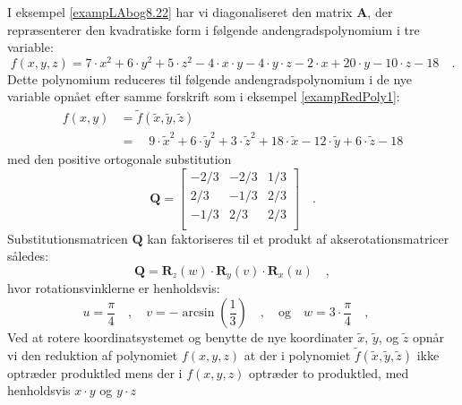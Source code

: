 \begin{example} \label{exampRedPoly3}
I eksempel \ref{exampLAbog8.22} har vi diagonaliseret den matrix $\mathbf{A}$, der repræsenterer den kvadratiske form i
følgende andengradspolynomium i tre variable:
\begin{equation}
f(x,y, z) = 7\cdot x^{2} + 6\cdot y^{2} + 5\cdot z^{2} - 4\cdot x\cdot y - 4\cdot y\cdot z - 2\cdot x + 20\cdot y -10\cdot z -18 \quad .
\end{equation}
Dette polynomium reduceres til følgende andengradspolynomium  i de nye variable opnået efter samme forskrift som i eksempel \ref{exampRedPoly1}:
\begin{equation}
\begin{aligned}
f(x,y) &= \widetilde{f}(\widetilde{x}, \widetilde{y}, \widetilde{z}) \\ &=  \quad 9\cdot \widetilde{x}^{2} + 6\cdot \widetilde{y}^{2}+ 3\cdot \widetilde{z}^{2} + 18\cdot \widetilde{x} -12\cdot \widetilde{y} +6\cdot \widetilde{z} -18
\end{aligned}
\end{equation}
med den positive ortogonale substitution
\begin{equation}
\mathbf{Q}= \left[
          \begin{array}{rrr}
            -2/3 & -2/3 & 1/3 \\
            2/3 & -1/3 & 2/3 \\
            -1/3 & 2/3 & 2/3 \\
          \end{array}
        \right] \quad .
\end{equation}
Substitutionsmatricen  $\mathbf{Q}$ kan faktoriseres til et produkt af  akserotationsmatricer således:
\begin{equation}
\mathbf{Q} = \mathbf{R}_{z}(w)\cdot \mathbf{R}_{y}(v)\cdot \mathbf{R}_{x}(u)  \quad,
\end{equation}
hvor rotationsvinklerne er henholdsvis:
\begin{equation}
u= \frac{\pi}{4}\quad , \quad v=-\arcsin\left( \frac{1}{3}\right) \quad ,  \quad \textrm{og} \quad w= 3\cdot\frac{\pi}{4} \quad , \quad
\end{equation}
Ved at rotere koordinatsystemet og benytte de nye koordinater $\widetilde{x}$, $\widetilde{y}$, og $\widetilde{z}$ opnår vi den reduktion af polynomiet $f(x,y,z)$  at der i polynomiet $\widetilde{f}(\widetilde{x}, \widetilde{y}, \widetilde{z})$ ikke optræder produktled mens der i $f(x,y,z)$ optræder to produktled,  med henholdsvis  $x\cdot y$ og $y \cdot z$
\end{example}









